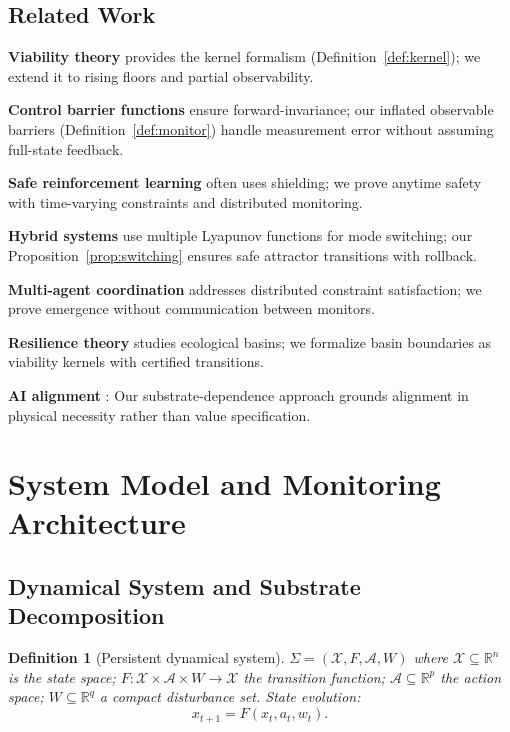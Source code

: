 \documentclass[11pt,a4paper]{article}
\newtheorem{definition}{Definition}
\begin{document}
\subsection{Related Work}

\textbf{Viability theory} \cite{aubin2009viability,frankowska2013viability} provides the kernel formalism (Definition~\ref{def:kernel}); we extend it to rising floors and partial observability.

\textbf{Control barrier functions} \cite{ames2016control,xu2015robustness} ensure forward-invariance; our inflated observable barriers (Definition~\ref{def:monitor}) handle measurement error without assuming full-state feedback.

\textbf{Safe reinforcement learning} \cite{achiam2017constrained,berkenkamp2017safe,thananjeyan2021recovery} often uses shielding; we prove anytime safety with time-varying constraints and distributed monitoring.

\textbf{Hybrid systems} \cite{branicky1998multiple,liberzon2003switching} use multiple Lyapunov functions for mode switching; our Proposition~\ref{prop:switching} ensures safe attractor transitions with rollback.

\textbf{Multi-agent coordination} \cite{fioretto2018distributed,shoham2008multiagent} addresses distributed constraint satisfaction; we prove emergence without communication between monitors.

\textbf{Resilience theory} \cite{holling1973resilience,walker2004resilience} studies ecological basins; we formalize basin boundaries as viability kernels with certified transitions.

\textbf{AI alignment} \cite{russell2019human,amodei2016concrete,christiano2017deep}: Our substrate-dependence approach grounds alignment in physical necessity rather than value specification.

\section{System Model and Monitoring Architecture}

\subsection{Dynamical System and Substrate Decomposition}

\begin{definition}[Persistent dynamical system]
\label{def:system}
$\Sigma = (\mathcal{X}, F, \mathcal{A}, W)$ where $\mathcal{X} \subseteq \mathbb{R}^n$ is the state space; $F: \mathcal{X} \times \mathcal{A} \times W \to \mathcal{X}$ the transition function; $\mathcal{A} \subseteq \mathbb{R}^p$ the action space; $W \subseteq \mathbb{R}^q$ a compact disturbance set. State evolution:
$$x_{t+1} = F(x_t, a_t, w_t).$$
\end{definition}
\end{document}
